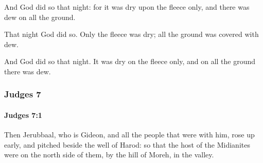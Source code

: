 			\begin{versebox}
					\item[BHS] 
					\item[ASV] And God did so that night: for it was dry upon the fleece only, and there was dew on all the ground.
					\item[NIV] That night God did so. Only the fleece was dry; all the ground was covered with dew.
					\item[NRSV] And God did so that night. It was dry on the fleece only, and on all the ground there was dew.
			\end{versebox}
	\subsubsection{Judges 7} %
		\label{JUDGES-7}

		\paragraph{Judges 7:1} %
			\label{JUDGES-7-1}

			Then Jerubbaal, who is Gideon, and all the people that were with him, rose up early, and pitched beside the well of Harod: so that the host of the Midianites were on the north side of them, by the hill of Moreh, in the valley.

